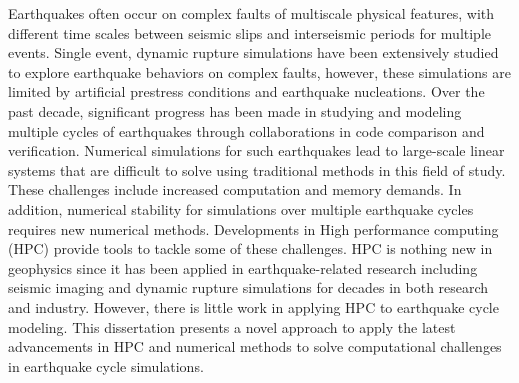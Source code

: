 Earthquakes often occur on complex faults of multiscale physical features, with different time scales between seismic slips and interseismic periods for multiple events.
Single event, dynamic rupture simulations have been extensively studied to explore earthquake behaviors on complex faults, however, these simulations are limited by artificial prestress conditions and earthquake nucleations.
Over the past decade, significant progress has been made in studying and modeling multiple cycles of earthquakes through collaborations in code comparison and verification.
Numerical simulations for such earthquakes lead to large-scale linear systems that are difficult to solve using traditional methods in this field of study.
These challenges include increased computation and memory demands.
In addition, numerical stability for simulations over multiple earthquake cycles requires new numerical methods.
Developments in High performance computing (HPC) provide tools to tackle some of these challenges.
HPC is nothing new in geophysics since it has been applied in earthquake-related research including seismic imaging and dynamic rupture simulations for decades in both research and industry.
However, there is little work in applying HPC to earthquake cycle modeling. 
This dissertation presents a novel approach to apply the latest advancements in HPC and numerical methods to solve computational challenges in earthquake cycle simulations.